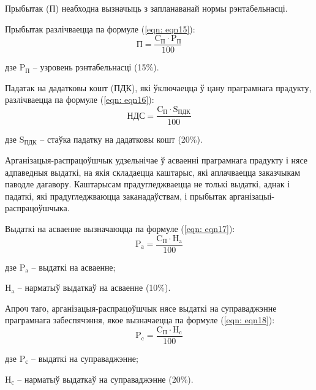 Прыбытак (П) неабходна вызначыць з запланаванай нормы рэнтабельнасці.

Прыбытак разлічваецца па формуле (\ref{eqn: eqn15}):
\begin{equation}
    \label{eqn: eqn15}
    \text{П} = \frac{\text{C}_\text{П} \cdot \text{P}_\text{П}}{100}
\end{equation}
\begin{Explanation}
    \item[дзе] $\text{P}_\text{П}$ -- узровень рэнтабельнасці (15\%).
\end{Explanation}

Падатак на дадатковы кошт (ПДК), які ўключаецца ў цану праграмнага прадукту, разлічваецца па формуле (\ref{eqn: eqn16}):
\begin{equation}
    \label{eqn: eqn16}
    \text{НДС} = \frac{\text{C}_\text{П} \cdot \text{S}_\text{ПДК}}{100}
\end{equation}
\begin{Explanation}
    \item[дзе] $\text{S}_\text{ПДК}$ -- стаўка падатку на дадатковы кошт (20\%).
\end{Explanation}

Арганізацыя-распрацоўшчык удзельнічае ў асваенні праграмнага прадукту і нясе адпаведныя выдаткі, на якія складаецца каштарыс, які аплачваецца заказчыкам паводле дагавору. Каштарысам прадугледжваецца не толькі выдаткі, аднак і падаткі, які прадугледжваюцца заканадаўствам, і прыбытак арганізацыі-распрацоўшчыка.

Выдаткі на асваенне вызначаюцца па формуле (\ref{eqn: eqn17}):
\begin{equation}
    \label{eqn: eqn17}
    \text{P}_\text{а} = \frac{\text{C}_\text{П} \cdot \text{H}_\text{a}}{100}
\end{equation}
\begin{Explanation}
    \item[дзе] $\text{P}_\text{a}$ -- выдаткі на асваенне;
    \item $\text{H}_\text{a}$ -- нарматыў выдаткаў на асваенне (10\%).
\end{Explanation}

Апроч таго, арганізацыя-распрацоўшчык нясе выдаткі на суправаджэнне праграмнага забеспячэння, якое вызначаецца па формуле (\ref{eqn: eqn18}):
\begin{equation}
    \label{eqn: eqn18}
    \text{P}_\text{c} = \frac{\text{C}_\text{П} \cdot \text{H}_\text{c}}{100}
\end{equation}
\begin{Explanation}
    \item[дзе] $\text{P}_\text{с}$ -- выдаткі на суправаджэнне;
    \item $\text{H}_\text{с}$ -- нарматыў выдаткаў на суправаджэнне (20\%).
\end{Explanation}

